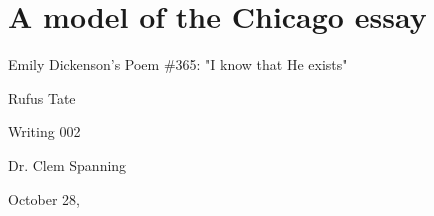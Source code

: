 \section{A model of the Chicago essay} \newpage 


\begin{tcolorbox}[enhanced,width=4.2in,left=.3in, right=.3in,
   drop fuzzy shadow southeast,
    boxrule=0.4pt,sharp corners,colframe=black!80!black,colback=white!10]

{\scriptsize 

\vspace{3.5cm}

\begin{center}Emily Dickenson's Poem \#365: "I know that He exists"
\vspace{3cm}

Rufus Tate

\vspace{5cm}
Writing 002

Dr. Clem Spanning

October 28, \the\year \end{center}

}

\vspace{.55cm}
\end{tcolorbox}

\newpage


\bigskip


